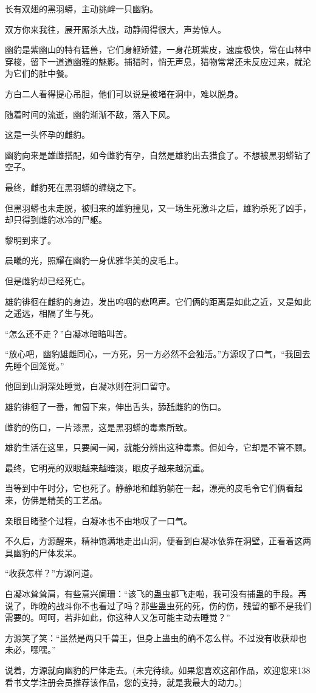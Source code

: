 \begin{this_body}
长有双翅的黑羽蟒，主动挑衅一只幽豹。

双方你来我往，展开厮杀大战，动静闹得很大，声势惊人。

幽豹是紫幽山的特有猛兽，它们身躯矫健，一身花斑紫皮，速度极快，常在山林中穿梭，留下一道道幽雅的魅影。捕猎时，悄无声息，猎物常常还未反应过来，就沦为它们的肚中餐。

方白二人看得提心吊胆，他们可以说是被堵在洞中，难以脱身。

随着时间的流逝，幽豹渐渐不敌，落入下风。

这是一头怀孕的雌豹。

幽豹向来是雄雌搭配，如今雌豹有孕，自然是雄豹出去猎食了。不想被黑羽蟒钻了空子。

最终，雌豹死在黑羽蟒的缠绕之下。

但黑羽蟒也未走脱，被归来的雄豹撞见，又一场生死激斗之后，雄豹杀死了凶手，却只得到雌豹冰冷的尸躯。

黎明到来了。

晨曦的光，照耀在幽豹一身优雅华美的皮毛上。

但是雌豹却已经死亡。

雄豹徘徊在雌豹的身边，发出呜咽的悲鸣声。它们俩的距离是如此之近，又是如此之遥远，相隔了生与死。

“怎么还不走？”白凝冰暗暗叫苦。

“放心吧，幽豹雄雌同心，一方死，另一方必然不会独活。”方源叹了口气，“我回去先睡个回笼觉。”

他回到山洞深处睡觉，白凝冰则在洞口留守。

雄豹徘徊了一番，匍匐下来，伸出舌头，舔舐雌豹的伤口。

雌豹的伤口，一片漆黑，这是黑羽蟒的毒素所致。

雄豹生活在这里，只要闻一闻，就能分辨出这种毒素。但如今，它却是不管不顾。

最终，它明亮的双眼越来越暗淡，眼皮子越来越沉重。

当等到中午时分，它也死了。静静地和雌豹躺在一起，漂亮的皮毛令它们俩看起来，仿佛是精美的工艺品。

亲眼目睹整个过程，白凝冰也不由地叹了一口气。

不久后，方源醒来，精神饱满地走出山洞，便看到白凝冰依靠在洞壁，正看着这两具幽豹的尸体发呆。

“收获怎样？”方源问道。

白凝冰耸耸肩，有些意兴阑珊：“该飞的蛊虫都飞走啦，我可没有捕蛊的手段。再说了，昨晚的战斗你不也看过了吗？那些蛊虫死的死，伤的伤，残留的都不是我们需要的。呵呵，若非如此，你这种人又怎可能主动去睡觉？”

方源笑了笑：“虽然是两只千兽王，但身上蛊虫的确不怎么样。不过没有收获却也未必，嘿嘿。”

说着，方源就向幽豹的尸体走去。(未完待续。如果您喜欢这部作品，欢迎您来138看书文学注册会员推荐该作品，您的支持，就是我最大的动力。)

\end{this_body}


